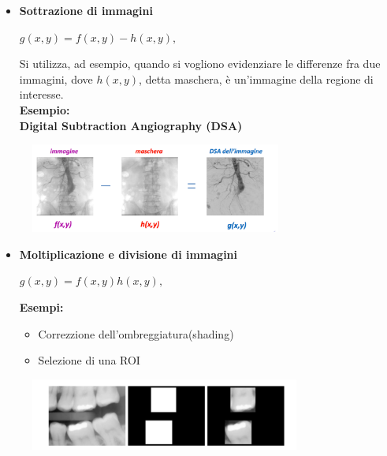\begin{itemize}
    \item \textbf{Sottrazione di immagini}
          \begin{center}
              $g(x,y) = f(x,y)-h(x,y),$
          \end{center}
          Si utilizza, ad esempio, quando si vogliono evidenziare le differenze fra due immagini,
          dove $h(x,y)$, detta maschera, è un'immagine della regione di interesse.
          \\ \textbf{Esempio:}
          \\ \textbf{Digital Subtraction Angiography (DSA)}
\end{itemize}
\begin{figure}[H]
    \centering
    \includegraphics[width=\linewidth, keepaspectratio]{capitoli/immagini/imgs/sottrazione.png}
\end{figure}


\begin{itemize}
    \item \textbf{Moltiplicazione e divisione di immagini}
          \begin{center}
              $g(x,y) = f(x,y)h(x,y),$
          \end{center}
          \textbf{Esempi:}
          \begin{itemize}
              \item Correzzione dell'ombreggiatura(shading)
              \item Selezione di una ROI
          \end{itemize}
\end{itemize}
\begin{figure}[H]
    \centering
    \includegraphics[width=\linewidth, keepaspectratio]{capitoli/immagini/imgs/moltiplicazione.png}
\end{figure}

